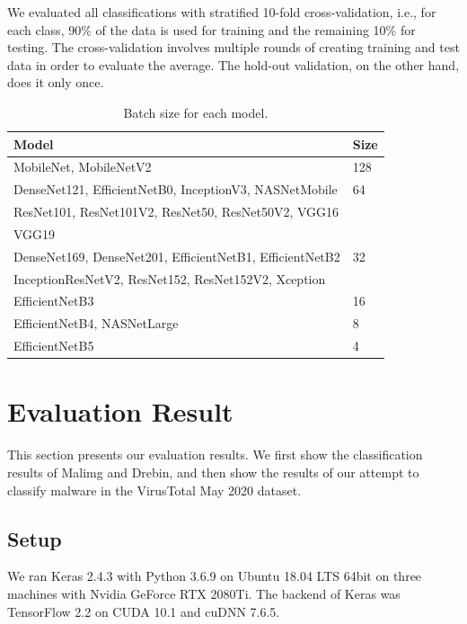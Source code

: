 \documentclass[conference]{IEEEtran}
\begin{document}
We evaluated all classifications with stratified 10-fold cross-validation, i.e., for each class, 90\% of the data is used for training and the remaining 10\% for testing. 
The cross-validation involves multiple rounds of creating training and test data in order to evaluate the average. The hold-out validation, on the other hand, does it only once.

\begin{table}[t]
	\caption{Batch size for each model.}
	\label{tab_batchsize}
	\centering
	\begin{tabular}{ll}
		\toprule
		Model & Size \\
		\midrule
		MobileNet, MobileNetV2  & 128 \\  \hline
		DenseNet121, EfficientNetB0, InceptionV3, NASNetMobile   & 64    \\  
		ResNet101, ResNet101V2, ResNet50, ResNet50V2, VGG16        &     \\  
		VGG19 &  \\  \hline
		DenseNet169, DenseNet201, EfficientNetB1, EfficientNetB2 & 32   \\ 
        InceptionResNetV2, ResNet152, ResNet152V2, Xception &      \\  \hline
		EfficientNetB3 & 16   \\  \hline
        EfficientNetB4, NASNetLarge & 8 \\ \hline
		EfficientNetB5 &  4   \\  
		\bottomrule
	\end{tabular}
\end{table}

\section{Evaluation Result}
\label{sec:evaluation}

This section presents our evaluation results.
We first show the classification results of Malimg and Drebin, and then show the results of our attempt to classify malware in the VirusTotal May 2020 dataset.

\subsection{Setup}
\label{sec:setup}

We ran Keras 2.4.3 with Python 3.6.9 on Ubuntu 18.04 LTS 64bit on three machines with Nvidia GeForce RTX 2080Ti. The backend of Keras was TensorFlow 2.2 on CUDA 10.1 and cuDNN 7.6.5. 
\end{document}
